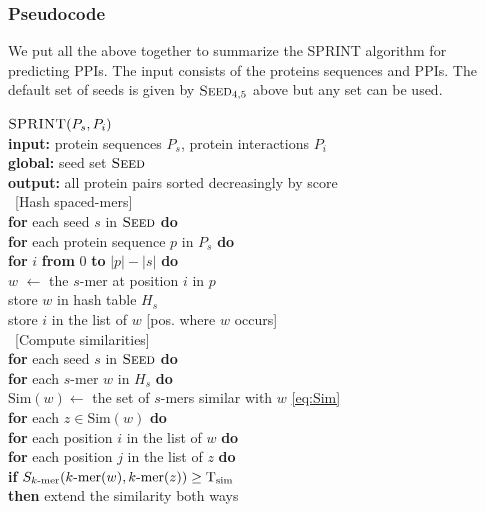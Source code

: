 \subsubsection{Pseudocode}
We put all the above together to summarize the SPRINT algorithm for predicting PPIs.
The input consists of the proteins sequences and PPIs. The default set of seeds is given by $\textsc{Seed}_{4,5}$ above but any set can be used.


\smallskip

\noindent
\setcounter{algccc}{0}
\underline{$\text{\sc SPRINT}(P_s,P_i)$}\\
\textbf{input:} protein sequences $P_s$, protein interactions $P_i$\\
\textbf{global:} seed set $\textsc{Seed}$\\
\textbf{output:} all protein pairs sorted decreasingly by score\\
\   [Hash spaced-mers]\\
\ccc  \textbf{for} each seed $s$ in $\textsc{Seed}$ \textbf{do}\\
\ccc  \qqa \textbf{for} each protein sequence $p$ in $P_s$ \textbf{do}\\
\ccc  \qqb \textbf{for} $i$ \textbf{from} $0$ \textbf{to} $|p| - |s|$ \textbf{do}   \\
\ccc  \qqc $w$ $\gets$ the $s$-mer at position $i$ in $p$\\
\ccc  \qqc store $w$ in hash table $H_s$\\
\ccc  \qqc store $i$ in the list of $w$ [pos. where $w$ occurs]\\
\   [Compute similarities]\\
\ccc  \textbf{for} each seed $s$ in $\textsc{Seed}$ \textbf{do}\\
\ccc  \qqa \textbf{for} each $s$-mer $w$ in $H_s$ \textbf{do}\\
\ccc  \qqb $\textrm{Sim}(w)\gets$ the set of $s$-mers similar with $w$ \eqref{eq:Sim} \\
\ccc  \qqb \textbf{for} each $z \in \textrm{Sim}(w)$ \textbf{do}\\
\ccc  \qqc \textbf{for} each position $i$ in the list of $w$ \textbf{do}\\
\ccc  \qqd \textbf{for} each position $j$ in the list of $z$ \textbf{do}\\
\ccc  \qqe \textbf{if} $S_\textrm{$k$-mer}(\textrm{$k$-mer}(w),\textrm{$k$-mer}(z)) \ge \operatorname{T_{\rm sim}}$\\
\ccc  \qqf \textbf{then} extend the similarity both ways\\
